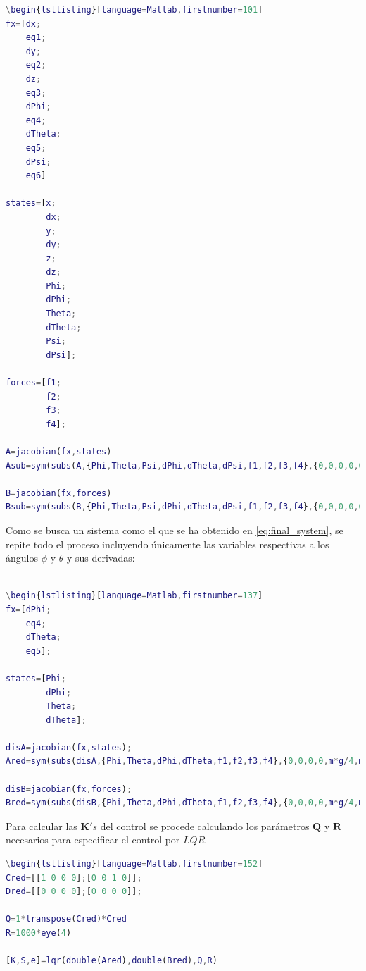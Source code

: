 \documentclass[twoside,11pt]{report}
\begin{document}
\singlespacing
\begin{lstlisting}[language=Matlab,firstnumber=100]
\begin{lstlisting}[language=Matlab,firstnumber=101]
fx=[dx;
    eq1;
    dy;
    eq2;
    dz;
    eq3;
    dPhi;
    eq4;
    dTheta;
    eq5;
    dPsi;
    eq6]

states=[x;
        dx;
        y;
        dy;
        z;
        dz;
        Phi;
        dPhi;
        Theta;
        dTheta;
        Psi;
        dPsi];

forces=[f1;
        f2;
        f3;
        f4];  
        
A=jacobian(fx,states)
Asub=sym(subs(A,{Phi,Theta,Psi,dPhi,dTheta,dPsi,f1,f2,f3,f4},{0,0,0,0,0,0,m*g/4,m*g/4,m*g/4,m*g/4}))

B=jacobian(fx,forces)
Bsub=sym(subs(B,{Phi,Theta,Psi,dPhi,dTheta,dPsi,f1,f2,f3,f4},{0,0,0,0,0,0,m*g/4,m*g/4,m*g/4,m*g/4}))        
\end{lstlisting}
\onehalfspacing

Como se busca un sistema como el que se ha obtenido en \ref{eq:final_system}, se repite todo el proceso incluyendo únicamente las variables respectivas a los ángulos $\phi$ y $\theta$ y sus derivadas:

\singlespacing
\begin{lstlisting}[language=Matlab,firstnumber=136]

\begin{lstlisting}[language=Matlab,firstnumber=137]
fx=[dPhi;
    eq4;
    dTheta;
    eq5];

states=[Phi;
        dPhi;
        Theta;
        dTheta];
        
disA=jacobian(fx,states);
Ared=sym(subs(disA,{Phi,Theta,dPhi,dTheta,f1,f2,f3,f4},{0,0,0,0,m*g/4,m*g/4,m*g/4,m*g/4}))

disB=jacobian(fx,forces);
Bred=sym(subs(disB,{Phi,Theta,dPhi,dTheta,f1,f2,f3,f4},{0,0,0,0,m*g/4,m*g/4,m*g/4,m*g/4}))        
\end{lstlisting}
\onehalfspacing

Para calcular las $\mathbf{K}'s$ del control se procede calculando los parámetros $\mathbf{Q}$ y $\mathbf{R}$ necesarios para especificar el control por $LQR$

\singlespacing
\begin{lstlisting}[language=Matlab,firstnumber=151]
\begin{lstlisting}[language=Matlab,firstnumber=152]
Cred=[[1 0 0 0];[0 0 1 0]];
Dred=[[0 0 0 0];[0 0 0 0]];

Q=1*transpose(Cred)*Cred
R=1000*eye(4)

[K,S,e]=lqr(double(Ared),double(Bred),Q,R)
\end{lstlisting}
\newpage
\end{document}
